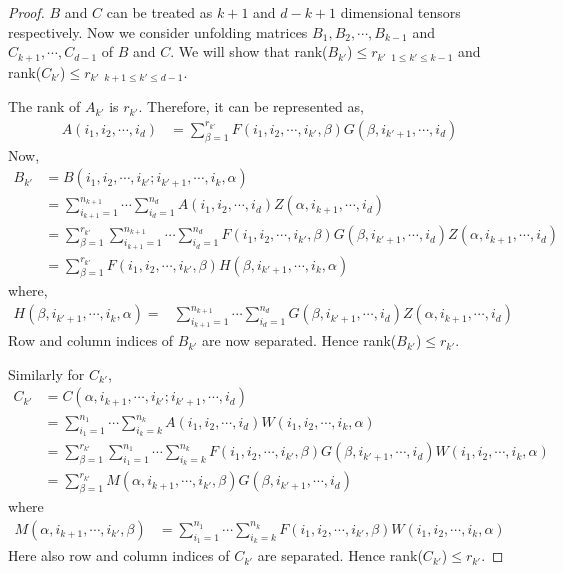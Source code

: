 \documentclass[runningheads]{llncs}
\begin{document}
\begin{proof}
	\noindent $B$ and $C$ can be treated as $k+1$ and $d-k+1$ dimensional tensors respectively. Now we consider unfolding matrices $B_1, B_2, \cdots, B_{k-1}$ and $C_{k+1},\cdots, C_{d-1}$ of $B$ and $C$. We will show that rank($B_{k'}$)$ \le r_{k'}$ $_{1\le k' \le k-1}$ and rank($C_{k'}$)$\le r_{k'}$ $_{k+1\le k' \le d-1}$.
	
	\noindent The rank of $A_{k'}$ is $r_{k'}$. Therefore, it can be represented as,
	\begin{align*}
	A(i_1, i_2, \cdots, i_d) &= \sum_{\beta=1}^{r_{k'}} F(i_1,i_2,\cdots ,i_{k'}, \beta) G(\beta, i_{k'+1},\cdots, i_d)
	\end{align*}
	Now, 
	\begin{align*}
	B_{k'} &= B(i_1,i_2, \cdots, i_{k'}; i_{k'+1},\cdots,i_k, \alpha)\\
	&= \sum_{i_{k+1}=1}^{n_{k+1}}\cdots\sum_{i_d=1}^{n_d} A(i_1, i_2, \cdots, i_d)Z(\alpha, i_{k+1},\cdots, i_d)\\
	&= \sum_{\beta=1}^{r_{k'}} \sum_{i_{k+1}=1}^{n_{k+1}}\cdots\sum_{i_d=1}^{n_d} F(i_1,i_2,\cdots ,i_{k'}, \beta) G(\beta, i_{k'+1},\cdots, i_d) Z(\alpha, i_{k+1},\cdots, i_d)\\
	&= \sum_{\beta=1}^{r_{k'}} F(i_1,i_2,\cdots ,i_{k'}, \beta) H(\beta,i_{k'+1},\cdots, i_k, \alpha)
	\end{align*}
	\noindent where,
	\begin{align*}
	H(\beta,i_{k'+1},\cdots, i_k, \alpha) =& \sum_{i_{k+1}=1}^{n_{k+1}}\cdots\sum_{i_d=1}^{n_d} G(\beta, i_{k'+1},\cdots, i_d) Z(\alpha, i_{k+1},\cdots, i_d)
	\end{align*}
	\noindent Row and column indices of $B_{k'}$ are now separated. Hence rank($B_{k'}$)$ \le r_{k'}$.
	
	\medskip
	\noindent Similarly for $C_{k'}$,
	\begin{align*}
	C_{k'}&= C(\alpha, i_{k+1}, \cdots, i_{k'}; i_{k'+1},\cdots, i_d)\\
	&= \sum_{i_1=1}^{n_1} \cdots \sum_{i_k=k}^{n_k} A(i_1, i_2, \cdots, i_d) W(i_1,i_2,\cdots, i_k, \alpha)\\
	&= \sum_{\beta=1}^{r_{k'}} \sum_{i_1=1}^{n_1} \cdots \sum_{i_k=k}^{n_k} F(i_1,i_2,\cdots ,i_{k'}, \beta) G(\beta, i_{k'+1},\cdots, i_d) W(i_1,i_2,\cdots, i_k, \alpha)\\ 
	&= \sum_{\beta=1}^{r_{k'}} M(\alpha, i_{k+1}, \cdots, i_{k'}, \beta) G(\beta, i_{k'+1},\cdots, i_d)
	\end{align*}	
	\noindent where
	\begin{align*}
	M(\alpha, i_{k+1}, \cdots, i_{k'}, \beta) &= \sum_{i_1=1}^{n_1} \cdots \sum_{i_k=k}^{n_k} F(i_1,i_2,\cdots ,i_{k'}, \beta) W(i_1,i_2,\cdots, i_k, \alpha)
	\end{align*}
	\noindent Here also row and column indices of $C_{k'}$ are separated. Hence rank($C_{k'}$)$ \le r_{k'}$.
	

\end{proof}
\end{document}
